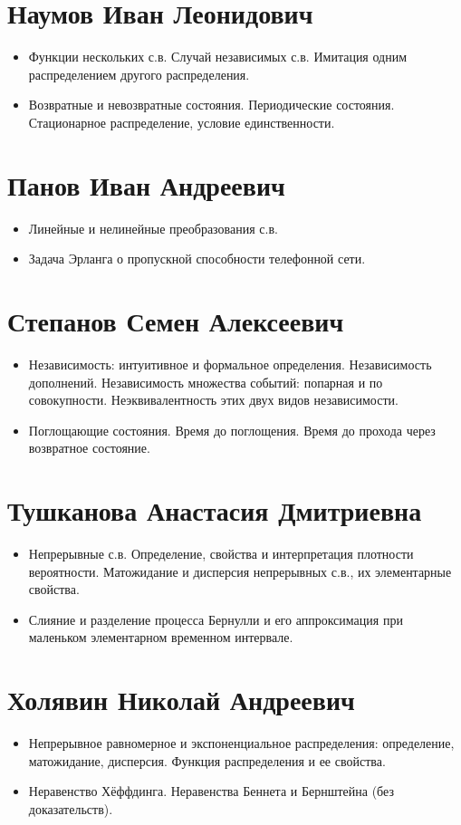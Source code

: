 \documentclass[12pt]{article}
\begin{document}
\section{Наумов Иван Леонидович}

\begin{itemize}
  \item Функции нескольких с.в. Случай независимых с.в. Имитация одним распределением другого распределения.
  \item Возвратные и невозвратные состояния. Периодические состояния. Стационарное распределение, условие единственности. 
\end{itemize}

\section{Панов Иван Андреевич}

\begin{itemize}
  \item Линейные и нелинейные преобразования с.в.
  \item Задача Эрланга о пропускной способности телефонной сети.
\end{itemize}

\section{Степанов Семен Алексеевич}

\begin{itemize}
  \item Независимость: интуитивное и формальное определения. Независимость дополнений. Независимость множества событий: попарная и по совокупности. Неэквивалентность этих двух видов независимости.
  \item Поглощающие состояния. Время до поглощения. Время до прохода через возвратное состояние.
\end{itemize}

\section{Тушканова Анастасия Дмитриевна}

\begin{itemize}
  \item Непрерывные с.в. Определение, свойства и интерпретация плотности вероятности. Матожидание и дисперсия непрерывных с.в., их элементарные свойства.
  \item Слияние и разделение процесса Бернулли и его аппроксимация при маленьком элементарном временном интервале.
\end{itemize}

\section{Холявин Николай Андреевич}

\begin{itemize}
  \item Непрерывное равномерное и экспоненциальное распределения: определение, матожидание, дисперсия. Функция распределения и ее свойства.
  \item Неравенство Хёффдинга. Неравенства Беннета и Бернштейна (без доказательств).
\end{itemize}
\end{document}
